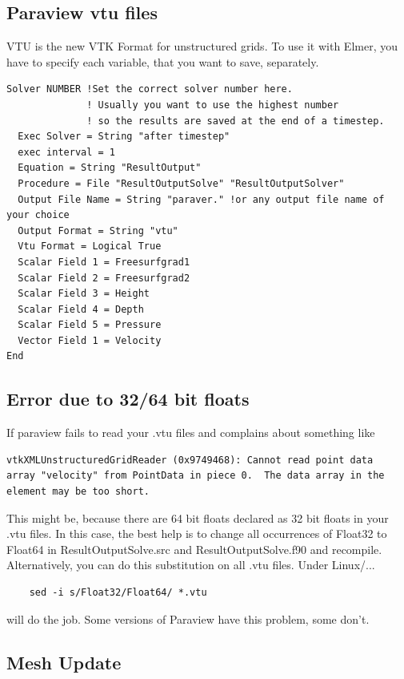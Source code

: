 \subsection{Paraview vtu files}

VTU is the new VTK Format for unstructured grids. To use it with Elmer, you have to specify each variable, that you want to save, separately.

\begin{verbatim}
Solver NUMBER !Set the correct solver number here.
              ! Usually you want to use the highest number 
              ! so the results are saved at the end of a timestep.
  Exec Solver = String "after timestep"	
  exec interval = 1
  Equation = String "ResultOutput"
  Procedure = File "ResultOutputSolve" "ResultOutputSolver"
  Output File Name = String "paraver." !or any output file name of your choice
  Output Format = String "vtu"
  Vtu Format = Logical True
  Scalar Field 1 = Freesurfgrad1
  Scalar Field 2 = Freesurfgrad2
  Scalar Field 3 = Height
  Scalar Field 4 = Depth
  Scalar Field 5 = Pressure
  Vector Field 1 = Velocity
End
\end{verbatim}

\subsection{Error due to 32/64 bit floats}

If paraview fails to read your .vtu files and complains about something like

\begin{verbatim}
vtkXMLUnstructuredGridReader (0x9749468): Cannot read point data 
array "velocity" from PointData in piece 0.  The data array in the
element may be too short.
\end{verbatim}

This might be, because there are 64 bit floats declared as 32 bit floats in your .vtu files. In this case, the best help is to change all occurrences of Float32 to Float64 in ResultOutputSolve.src and ResultOutputSolve.f90 and recompile. Alternatively, you can do this substitution on all .vtu files. Under Linux/...

\begin{verbatim}
    sed -i s/Float32/Float64/ *.vtu
\end{verbatim}

\noindent will do the job. Some versions of Paraview have this problem, some don't.

\subsection{Mesh Update}


